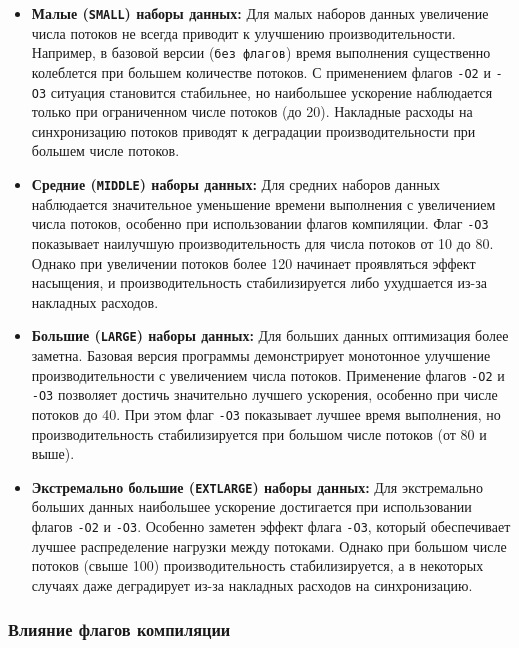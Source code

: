 \documentclass[a4paper, 11pt]{article}
\begin{document}
\begin{itemize}
    \item \textbf{Малые (\texttt{SMALL}) наборы данных:} 
    Для малых наборов данных увеличение числа потоков не всегда приводит к улучшению производительности. Например, в базовой версии (\texttt{без флагов}) время выполнения существенно колеблется при большем количестве потоков. С применением флагов \texttt{-O2} и \texttt{-O3} ситуация становится стабильнее, но наибольшее ускорение наблюдается только при ограниченном числе потоков (до 20). Накладные расходы на синхронизацию потоков приводят к деградации производительности при большем числе потоков.

    \item \textbf{Средние (\texttt{MIDDLE}) наборы данных:} 
    Для средних наборов данных наблюдается значительное уменьшение времени выполнения с увеличением числа потоков, особенно при использовании флагов компиляции. Флаг \texttt{-O3} показывает наилучшую производительность для числа потоков от 10 до 80. Однако при увеличении потоков более 120 начинает проявляться эффект насыщения, и производительность стабилизируется либо ухудшается из-за накладных расходов.

    \item \textbf{Большие (\texttt{LARGE}) наборы данных:}
    Для больших данных оптимизация более заметна. Базовая версия программы демонстрирует монотонное улучшение производительности с увеличением числа потоков. Применение флагов \texttt{-O2} и \texttt{-O3} позволяет достичь значительно лучшего ускорения, особенно при числе потоков до 40. При этом флаг \texttt{-O3} показывает лучшее время выполнения, но производительность стабилизируется при большом числе потоков (от 80 и выше).

    \item \textbf{Экстремально большие (\texttt{EXTLARGE}) наборы данных:} 
    Для экстремально больших данных наибольшее ускорение достигается при использовании флагов \texttt{-O2} и \texttt{-O3}. Особенно заметен эффект флага \texttt{-O3}, который обеспечивает лучшее распределение нагрузки между потоками. Однако при большом числе потоков (свыше 100) производительность стабилизируется, а в некоторых случаях даже деградирует из-за накладных расходов на синхронизацию.
\end{itemize}

\subsubsection*{Влияние флагов компиляции}
\end{document}
